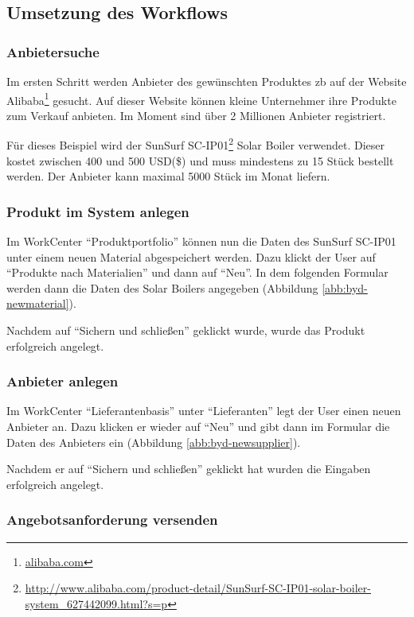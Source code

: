 \subsection{Umsetzung des Workflows}
\label{sec:byd-bsp-umsetzung}

\subsubsection{Anbietersuche}

Im ersten Schritt werden Anbieter des gewünschten Produktes \gls{zb} auf der Website Alibaba\footnote{\url{alibaba.com}} gesucht. Auf dieser Website können kleine Unternehmer ihre Produkte zum Verkauf anbieten. Im Moment sind über 2 Millionen Anbieter registriert.

Für dieses Beispiel wird der SunSurf SC-IP01\footnote{\url{http://www.alibaba.com/product-detail/SunSurf-SC-IP01-solar-boiler-system_627442099.html?s=p}} Solar Boiler verwendet. Dieser kostet zwischen 400 und 500 USD(\$) und muss mindestens zu 15 Stück bestellt werden. Der Anbieter kann maximal 5000 Stück im Monat liefern.

\subsubsection{Produkt im System anlegen}

Im WorkCenter "`Produktportfolio"' können nun die Daten des SunSurf SC-IP01 unter einem neuen Material abgespeichert werden. Dazu klickt der User auf "`Produkte nach Materialien"' und dann auf "`Neu"'. In dem folgenden Formular werden dann die Daten des Solar Boilers angegeben (Abbildung \ref{abb:byd-newmaterial}).

Nachdem auf "`Sichern und schließen"' geklickt wurde, wurde das Produkt erfolgreich angelegt.

\subsubsection{Anbieter anlegen}

Im WorkCenter "`Lieferantenbasis"' unter "`Lieferanten"' legt der User einen neuen Anbieter an. Dazu klicken er wieder auf "`Neu"' und gibt dann im Formular die Daten des Anbieters ein (Abbildung \ref{abb:byd-newsupplier}).

Nachdem er auf "`Sichern und schließen"' geklickt hat wurden die Eingaben erfolgreich angelegt.

\subsubsection{Angebotsanforderung versenden}

